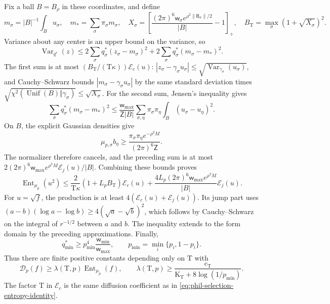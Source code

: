 Fix a ball \(B=B_\rho\) in these coordinates, and define
\[
 m_\sigma=|B|^{-1}\int_Bu_\sigma,
 \quad m_* =\sum_\sigma\pi_\sigma m_\sigma,
 \quad X_\sigma=
 \left[\frac{(2\pi)^6\mathsf w_\sigma
                   e^{\rho^2\|\mathsf B_\sigma\|/2}}{|B|}-1\right]_+,
 \quad B_{\mathrm T}=\max_\sigma(1+\sqrt{X_\sigma})^2.
\]
Variance about any center is an upper bound on the variance, so
\[
 \operatorname{Var}_{q^*}(z)
 \le2\sum_\sigma q_\sigma^*(z_\sigma-m_\sigma)^2
     +2\sum_\sigma q_\sigma^*(m_\sigma-m_*)^2.
\]
The first sum is at most \((B_{\mathrm T}/(\mathrm T\kappa))\mathscr E_c(u)\):
\(|z_\sigma-\gamma_\sigma u_\sigma|\le
\sqrt{\operatorname{Var}_{\gamma_\sigma}(u_\sigma)}\), and
Cauchy--Schwarz bounds \(|m_\sigma-\gamma_\sigma u_\sigma|\) by the same
standard deviation times
\(\sqrt{\chi^2(\operatorname{Unif}(B)\Vert\gamma_\sigma)}
\le\sqrt{X_\sigma}\).
For the second sum, Jensen's inequality gives
\[
 \sum_\sigma q_\sigma^*(m_\sigma-m_*)^2
 \le\frac{\mathsf w_{\max}}
              {\mathsf Z|B|}
       \sum_{\sigma,\eta}\pi_\sigma\pi_\eta
                          \int_B(u_\sigma-u_\eta)^2.
\]
On \(B\), the explicit Gaussian densities give
\[
 \mu_{p,\sigma}b_\eta
 \ge\frac{\pi_\sigma\pi_\eta e^{-\rho^2M}}
              {(2\pi)^6\mathsf Z}.
\]
The normalizer therefore cancels, and the preceding sum is at most
\(2(2\pi)^6\mathsf w_{\max}e^{\rho^2M}
 \mathscr E_j(u)/|B|\).
Combining these bounds proves
\[
 \operatorname{Ent}_{\mu_p}(u^2)
 \le\frac2{\mathrm T\kappa}(1+L_pB_{\mathrm T})\mathscr E_c(u)
    +\frac{4L_p(2\pi)^6\mathsf w_{\max}e^{\rho^2M}}{|B|}
                                                       \mathscr E_j(u).
\]
For \(u=\sqrt f\), the production is at least
\(4(\mathscr E_c(u)+\mathscr E_j(u))\). Its jump part uses
\((a-b)(\log a-\log b)\ge4(\sqrt a-\sqrt b)^2\), which follows by
Cauchy--Schwarz on the integral of \(r^{-1/2}\) between \(a\) and \(b\).
The inequality extends to the form domain by the preceding approximations.
Finally,
\[
 q_{\min}^*\ge p_{\min}^4
                 \frac{\mathsf w_{\min}}
                      {\mathsf w_{\max}},\qquad
 p_{\min}=\min_i\{p_i,1-p_i\}.
\]
Thus there are finite positive constants depending only on \(\mathrm T\)
with
\begin{equation}
 \mathscr D_p(f)\ge\lambda(\mathrm T,p)
                         \operatorname{Ent}_{\mu_p}(f),\qquad
 \lambda(\mathrm T,p)\ge
 \frac{\mathrm c_{\mathrm T}}
      {\mathrm K_{\mathrm T}+8\log(1/p_{\min})}.
\label{eq:phil-selection-entropy-contraction}
\end{equation}
The factor \(\mathrm T\) in \(\mathscr E_c\) is the same diffusion
coefficient as in \cref{eq:phil-selection-entropy-identity}.

